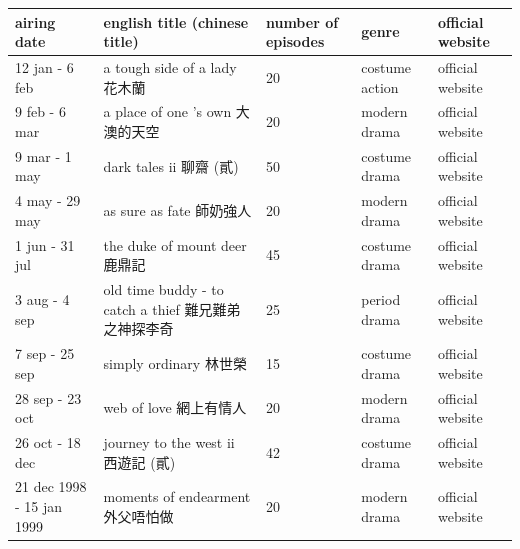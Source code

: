 \documentclass{article}
\begin{document}
\begin{tabular}{lllll}
\toprule
airing date & english title (chinese title) & number of episodes & genre & official website \\
\midrule
12 jan - 6 feb & a tough side of a lady 花木蘭 & 20 & costume action & official website \\
9 feb - 6 mar & a place of one 's own 大澳的天空 & 20 & modern drama & official website \\
9 mar - 1 may & dark tales ii 聊齋 (貳) & 50 & costume drama & official website \\
4 may - 29 may & as sure as fate 師奶強人 & 20 & modern drama & official website \\
1 jun - 31 jul & the duke of mount deer 鹿鼎記 & 45 & costume drama & official website \\
3 aug - 4 sep & old time buddy - to catch a thief 難兄難弟之神探李奇 & 25 & period drama & official website \\
7 sep - 25 sep & simply ordinary 林世榮 & 15 & costume drama & official website \\
28 sep - 23 oct & web of love 網上有情人 & 20 & modern drama & official website \\
26 oct - 18 dec & journey to the west ii 西遊記 (貳) & 42 & costume drama & official website \\
21 dec 1998 - 15 jan 1999 & moments of endearment 外父唔怕做 & 20 & modern drama & official website \\
\bottomrule
\end{tabular}
\end{document}
